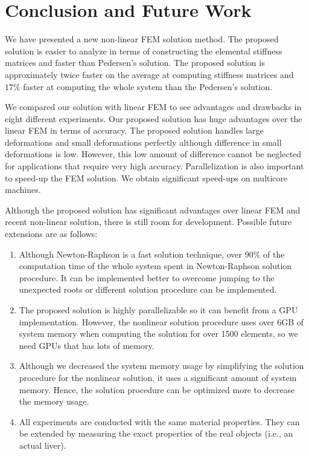 \chapter{Conclusion and Future Work}
\label{chapter7}

We have presented a new non-linear FEM solution method. The proposed solution is easier to analyze in terms of constructing the elemental stiffness matrices and faster than Pedersen's solution. The proposed solution is approximately twice faster on the average at computing stiffness matrices and $17\%$ faster at computing the whole system than the Pedersen's solution. 

We compared our solution with linear FEM to see advantages and drawbacks in eight different experiments. Our proposed solution has huge advantages over the linear FEM in terms of accuracy. The proposed solution handles large deformations and small deformations perfectly although difference in small deformations is low. However, this low amount of difference cannot be neglected for applications that require very high accuracy. Parallelization is also important to speed-up the FEM solution. We obtain significant speed-ups on multicore machines. 

Although the proposed solution has significant advantages over linear FEM and recent non-linear solution, there is still room for development. Possible future extensions are as follows:

\begin{enumerate}
\item Although Newton-Raphson is a fast solution technique, over $90\%$ of the computation time of the whole system spent in Newton-Raphson solution procedure. It can be implemented better to overcome jumping to the unexpected roots or different solution procedure can be implemented.
\item The proposed solution is highly parallelizable so it can benefit from a GPU implementation. However, the nonlinear solution procedure uses over 6GB of system memory when computing the solution for over 1500 elements, so we need GPUs that has lots of memory.
\item Although we decreased the system memory usage by simplifying the solution procedure for the nonlinear solution, it uses a significant amount of system memory. Hence, the solution procedure can be optimized more to decrease the memory usage.
\item All experiments are conducted with the same material properties. They can be extended by measuring the exact properties of the  real objects (i.e., an actual liver).
\end{enumerate}



